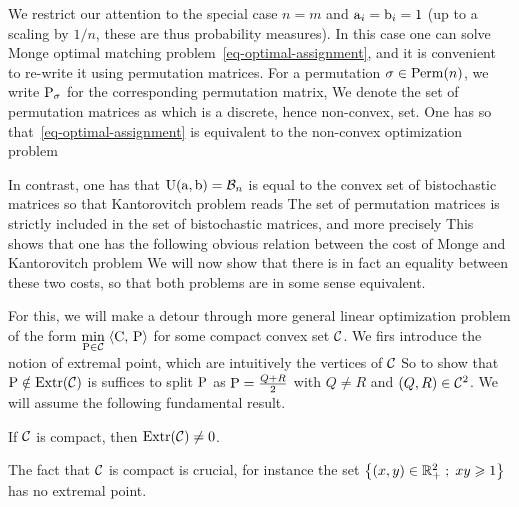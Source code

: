 We restrict our attention to the special case $n=m$ and $\a_i=\b_i=1$ (up to a scaling by $1/n$, these are thus probability measures).
%
In this case one can solve Monge optimal matching problem~\eqref{eq-optimal-assignment}, and it is convenient to re-write it using permutation matrices. 
%
For a permutation $\si\in\Perm(n)$, we write $\P_{\si}$ for the corresponding permutation matrix,
We denote the set of permutation matrices as
which is a discrete, hence non-convex, set. One has
so that~\eqref{eq-optimal-assignment} is equivalent to the non-convex optimization problem

In contrast, one has that $\CouplingsD(\a,\b) = \Bb_n$ is equal to the convex set of bistochastic matrices 
so that Kantorovitch problem reads 
The set of permutation matrices is strictly included in the set of bistochastic matrices, and more precisely
This shows that one has the following obvious relation between the cost of Monge and Kantorovitch problem
We will now show that there is in fact an equality between these two costs, so that both problems are in some sense equivalent. 


For this, we will make a detour through more general linear optimization problem of the form $\umin{\P \in \Cc} \dotp{\C}{\P}$ for some compact convex set $\Cc$. We firs introduce the notion of extremal point, which are intuitively the vertices of $\Cc$
So to show that $\P \notin \text{Extr}(\Cc)$ is suffices to split $\P$ as $\P = \frac{Q+R}{2}$ with $Q \neq R$ and $(Q,R) \in \Cc^2$.
%
We will assume the following fundamental result.

\begin{prop}
	If $\Cc$ is compact, then $\text{\upshape Extr}(\Cc) \neq 0$.
\end{prop}

The fact that $\Cc$ is compact is crucial, for instance the set $\enscond{(x,y) \in \RR_+^2}{ xy \geq 1}$ has no extremal point. 

